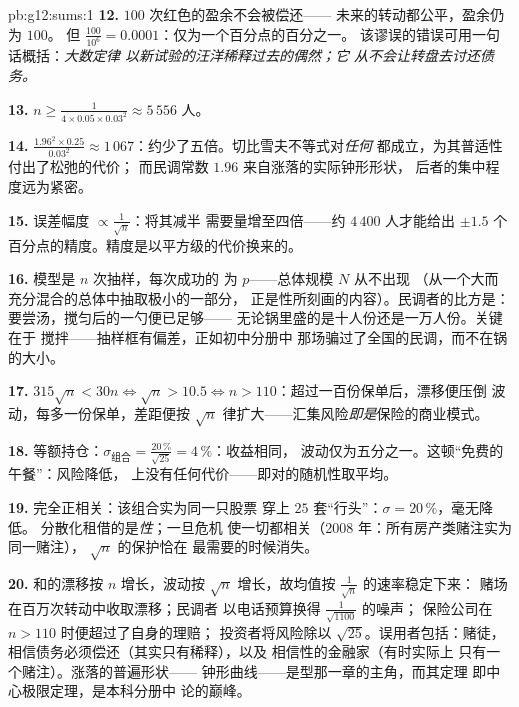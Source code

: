 \begin{solution}{pb:g12:sums:1}
\textbf{12.} $100$ 次红色的盈余不会被偿还——
未来的转动都公平，盈余仍为 $100$。
但 $\frac{100}{10^6} = 0.0001$：仅为一个百分点的百分之一。
该谬误的错误可用一句话概括：\emph{大数定律
以新试验的汪洋稀释过去的偶然；它
从不会让转盘去讨还债务。}

\textbf{13.} $n \geq \frac{1}{4 \times 0.05 \times 0.03^2}
\approx 5\,556$ 人。

\textbf{14.} $\frac{1.96^2 \times 0.25}{0.03^2} \approx
1\,067$：约少了五倍。切比雪夫不等式对\emph{任何}
都成立，为其普适性付出了松弛的代价；
而民调常数 $1.96$ 来自涨落的实际钟形形状，
后者的集中程度远为紧密。

\textbf{15.} 误差幅度 $\propto \frac{1}{\sqrt n}$：将其减半
需要量增至四倍——约 $4\,400$ 人才能给出
$\pm 1.5$ 个百分点的精度。精度是以平方级的代价换来的。

\textbf{16.} 模型是 $n$ 次抽样，每次成功的
为 $p$——总体规模 $N$ 从不出现
（从一个大而充分混合的总体中抽取极小的一部分，
正是性所刻画的内容）。民调者的比方是：
要尝汤，搅匀后的一勺便已足够——
无论锅里盛的是十人份还是一万人份。关键在于
搅拌——抽样框有偏差，正如初中分册中
那场骗过了全国的民调，而不在锅的大小。

\textbf{17.} $315\sqrt n < 30n \iff \sqrt n > 10.5 \iff
n > 110$：超过一百份保单后，漂移便压倒
波动，每多一份保单，差距便按
$\sqrt n$ 律扩大——汇集风险\emph{即是}保险的商业模式。

\textbf{18.} 等额持仓：$\sigma_{\text{组合}} =
\frac{20\,\%}{\sqrt{25}} = 4\,\%$：收益相同，
波动仅为五分之一。这顿“免费的午餐”：风险降低，
上没有任何代价——即对的随机性取平均。

\textbf{19.} 完全正相关：该组合实为同一只股票
穿上 $25$ 套“行头”：$\sigma = 20\,\%$，毫无降低。
分散化租借的是\emph{性}；一旦危机
使一切都相关（2008 年：所有房产类赌注实为同一赌注），
$\sqrt n$ 的保护恰在
最需要的时候消失。

\textbf{20.} 和的漂移按 $n$ 增长，波动按
$\sqrt n$ 增长，故均值按 $\frac{1}{\sqrt n}$ 的速率稳定下来：
赌场在百万次转动中收取漂移；民调者
以电话预算换得 $\frac{1}{\sqrt{1100}}$ 的噪声；
保险公司在 $n > 110$ 时便超过了自身的理赔；
投资者将风险除以 $\sqrt{25}$。误用者包括：赌徒，
相信债务必须偿还（其实只有稀释），以及
相信性的金融家（有时实际上
只有一个赌注）。涨落的普遍形状——
钟形曲线——是型那一章的主角，而其定理
即中心极限定理，是本科分册中
论的巅峰。
\end{solution}
